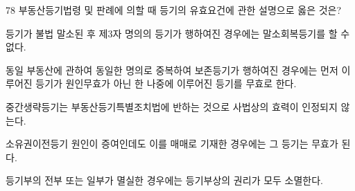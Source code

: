 \begin{question}{78}
부동산등기법령 및 판례에 의할 때 등기의 유효요건에 관한 설명으로 옳은 것은?
\begin{choices}
  \item 등기가 불법 말소된 후 제3자 명의의 등기가 행하여진 경우에는 말소회복등기를 할 수 없다.
  \item 동일 부동산에 관하여 동일한 명의로 중복하여 보존등기가 행하여진 경우에는 먼저 이루어진 등기가 원인무효가 아닌 한 나중에 이루어진 등기를 무효로 한다.
  \item 중간생략등기는 부동산등기특별조치법에 반하는 것으로 사법상의 효력이 인정되지 않는다.
  \item 소유권이전등기 원인이 증여인데도 이를 매매로 기재한 경우에는 그 등기는 무효가 된다.
  \item 등기부의 전부 또는 일부가 멸실한 경우에는 등기부상의 권리가 모두 소멸한다.
\end{choices}
\end{question}
